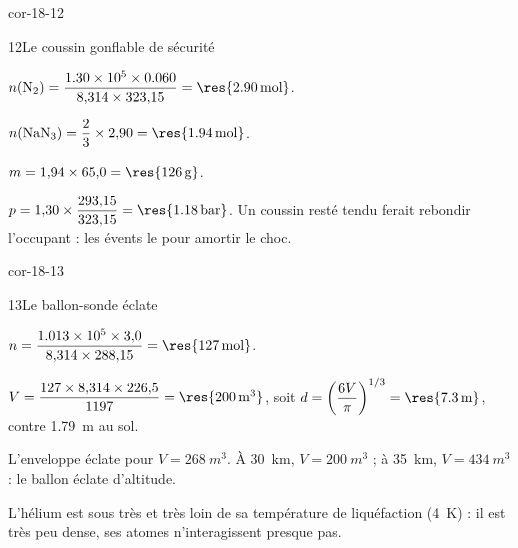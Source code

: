 \begin{blocLivre}{cor-18-12}
\begin{corrige}{12}{Le coussin gonflable de sécurité}
\begin{questions}
\item $n(\ce{N2})=\dfrac{\num{1.30e5}\times\num{0.060}}{8{,}314\times323{,}15}=\res{\qty{2,90}{mol}}$.
\item $n(\ce{NaN3})=\dfrac23\times2{,}90=\res{\qty{1,94}{mol}}$.
\item $m=1{,}94\times65{,}0=\res{\qty{126}{g}}$.
\item $p=1{,}30\times\dfrac{293{,}15}{323{,}15}=\res{\qty{1,18}{bar}}$. Un coussin resté tendu ferait rebondir l'occupant : les
évents le  pour amortir le choc.
\end{questions}
\end{corrige}
\end{blocLivre}
\begin{blocLivre}{cor-18-13}
\begin{corrige}{13}{Le ballon-sonde éclate}
\begin{questions}
\item $n=\dfrac{\num{1.013e5}\times3{,}0}{8{,}314\times288{,}15}=\res{\qty{127}{mol}}$.
\item $V=\dfrac{127\times8{,}314\times226{,}5}{1197}=\res{\qty{200}{m^3}}$, soit $d=\left(\dfrac{6V}{\pi}\right)^{1/3}=\res{\qty{7,3}{m}}$,
contre \qty{1,79}{m} au sol.
\item L'enveloppe éclate pour $V=\qty{268}{m^3}$. À \qty{30}{km}, $V=\qty{200}{m^3}$ ; à \qty{35}{km}, $V=\qty{434}{m^3}$ : le ballon
éclate  d'altitude.
\item L'hélium est sous très  et très loin de sa température de liquéfaction (\qty{4}{K}) : il
est très peu dense, ses atomes n'interagissent presque pas.
\end{questions}
\end{corrige}
\end{blocLivre}
